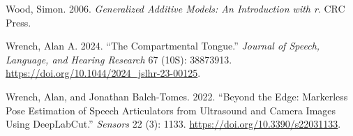 \documentclass[
]{interact}
\newlength{\cslhangindent}
\newenvironment{CSLReferences}[2] %
 {\begin{list}{}{%
  \setlength{\itemindent}{0pt}
  \setlength{\leftmargin}{0pt}
  \setlength{\parsep}{0pt}
  \ifodd #1
   \setlength{\leftmargin}{\cslhangindent}
   \setlength{\itemindent}{-1\cslhangindent}
  \fi
  \setlength{\itemsep}{#2\baselineskip}}}
 {\end{list}}
\begin{document}
\begin{CSLReferences}{1}{0}
Wood, Simon. 2006. \emph{Generalized Additive Models: An Introduction
with r}. CRC Press.

Wrench, Alan A. 2024. {``The Compartmental Tongue.''} \emph{Journal of
Speech, Language, and Hearing Research} 67 (10S): 38873913.
\url{https://doi.org/10.1044/2024_jslhr-23-00125}.

Wrench, Alan, and Jonathan Balch-Tomes. 2022. {``Beyond the Edge:
Markerless Pose Estimation of Speech Articulators from Ultrasound and
Camera Images Using DeepLabCut.''} \emph{Sensors} 22 (3): 1133.
\url{https://doi.org/10.3390/s22031133}.

\end{CSLReferences}
\end{document}
